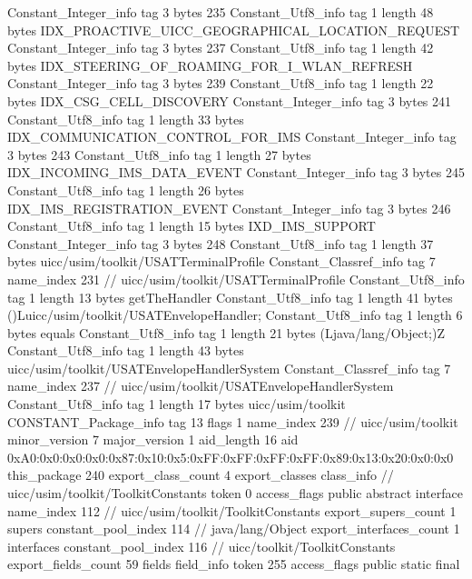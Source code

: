 {{{		}
		Constant_Integer_info {
			tag	3
			bytes	235
		}
		Constant_Utf8_info {
			tag	1
			length	48
			bytes	IDX_PROACTIVE_UICC_GEOGRAPHICAL_LOCATION_REQUEST
		}
		Constant_Integer_info {
			tag	3
			bytes	237
		}
		Constant_Utf8_info {
			tag	1
			length	42
			bytes	IDX_STEERING_OF_ROAMING_FOR_I_WLAN_REFRESH
		}
		Constant_Integer_info {
			tag	3
			bytes	239
		}
		Constant_Utf8_info {
			tag	1
			length	22
			bytes	IDX_CSG_CELL_DISCOVERY
		}
		Constant_Integer_info {
			tag	3
			bytes	241
		}
		Constant_Utf8_info {
			tag	1
			length	33
			bytes	IDX_COMMUNICATION_CONTROL_FOR_IMS
		}
		Constant_Integer_info {
			tag	3
			bytes	243
		}
		Constant_Utf8_info {
			tag	1
			length	27
			bytes	IDX_INCOMING_IMS_DATA_EVENT
		}
		Constant_Integer_info {
			tag	3
			bytes	245
		}
		Constant_Utf8_info {
			tag	1
			length	26
			bytes	IDX_IMS_REGISTRATION_EVENT
		}
		Constant_Integer_info {
			tag	3
			bytes	246
		}
		Constant_Utf8_info {
			tag	1
			length	15
			bytes	IXD_IMS_SUPPORT
		}
		Constant_Integer_info {
			tag	3
			bytes	248
		}
		Constant_Utf8_info {
			tag	1
			length	37
			bytes	uicc/usim/toolkit/USATTerminalProfile
		}
		Constant_Classref_info {
			tag	7
			name_index	231		// uicc/usim/toolkit/USATTerminalProfile
		}
		Constant_Utf8_info {
			tag	1
			length	13
			bytes	getTheHandler
		}
		Constant_Utf8_info {
			tag	1
			length	41
			bytes	()Luicc/usim/toolkit/USATEnvelopeHandler;
		}
		Constant_Utf8_info {
			tag	1
			length	6
			bytes	equals
		}
		Constant_Utf8_info {
			tag	1
			length	21
			bytes	(Ljava/lang/Object;)Z
		}
		Constant_Utf8_info {
			tag	1
			length	43
			bytes	uicc/usim/toolkit/USATEnvelopeHandlerSystem
		}
		Constant_Classref_info {
			tag	7
			name_index	237		// uicc/usim/toolkit/USATEnvelopeHandlerSystem
		}
		Constant_Utf8_info {
			tag	1
			length	17
			bytes	uicc/usim/toolkit
		}
		CONSTANT_Package_info {
			tag	13
			flags	1
			name_index	239		// uicc/usim/toolkit
			minor_version	7
			major_version	1
			aid_length	16
			aid	0xA0:0x0:0x0:0x0:0x87:0x10:0x5:0xFF:0xFF:0xFF:0xFF:0x89:0x13:0x20:0x0:0x0
		}
	}
	this_package	240
	export_class_count	4
	export_classes {
		class_info {		// uicc/usim/toolkit/ToolkitConstants
			token	0
			access_flags	public abstract interface
			name_index	112		// uicc/usim/toolkit/ToolkitConstants
			export_supers_count	1
			supers {
				constant_pool_index	114		// java/lang/Object
			}
			export_interfaces_count	1
			interfaces {
				constant_pool_index	116		// uicc/toolkit/ToolkitConstants
			}
			export_fields_count	59
			fields {
			field_info {
				token	255
				access_flags	public static final
}}}}}
